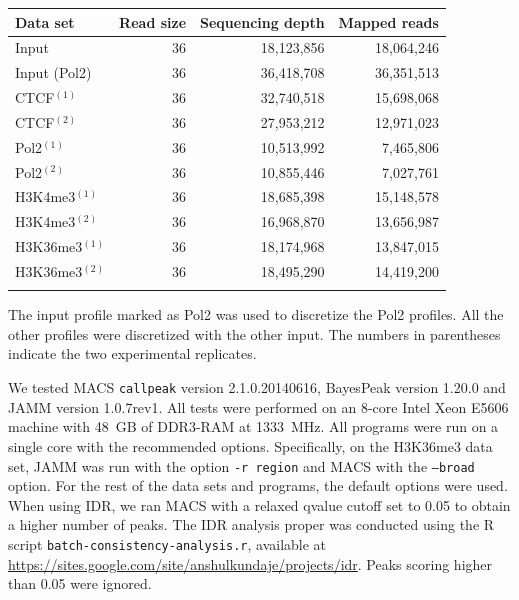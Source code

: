 \documentclass{bioinfo}
\begin{document}
\begin{methods}
\begin{table}[!tbp]
{\begin{tabular}{lrrr}
        \toprule
        \textbf{Data set} & \textbf{Read size} &
        \textbf{Sequencing depth} & \textbf{Mapped reads} \\
        \midrule
        Input            & 36 & 18,123,856 & 18,064,246 \\
        Input (Pol2)     & 36 & 36,418,708 & 36,351,513 \\
        CTCF$^{(1)}$     & 36 & 32,740,518 & 15,698,068 \\
        CTCF$^{(2)}$     & 36 & 27,953,212 & 12,971,023 \\
        Pol2$^{(1)}$     & 36 & 10,513,992 &  7,465,806 \\
        Pol2$^{(2)}$     & 36 & 10,855,446 &  7,027,761 \\
        H3K4me3$^{(1)}$  & 36 & 18,685,398 & 15,148,578 \\
        H3K4me3$^{(2)}$  & 36 & 16,968,870 & 13,656,987 \\
        H3K36me3$^{(1)}$ & 36 & 18,174,968 & 13,847,015 \\
        H3K36me3$^{(2)}$ & 36 & 18,495,290 & 14,419,200 \\
        \botrule
\end{tabular}}{The input profile marked as Pol2 was used to discretize the
Pol2 profiles. All the other profiles were discretized with the other input.
The numbers in parentheses indicate the two experimental replicates.}
\end{table}

We tested MACS \texttt{callpeak} version 2.1.0.20140616, BayesPeak
version 1.20.0 and JAMM version 1.0.7rev1. All tests were performed on
an 8-core Intel Xeon E5606 machine with 48~GB of DDR3-RAM at 1333~MHz.
All programs were run on a single core with the recommended options.
Specifically, on the H3K36me3 data set, JAMM was run with the option
\texttt{-r region} and MACS with the \texttt{--broad} option. For the rest of
the data sets and programs, the default options were used.
When using IDR, we ran MACS with a relaxed qvalue cutoff set to 0.05
to obtain a higher number of peaks. The IDR analysis proper was conducted
using the R script \texttt{batch-consistency-analysis.r}, available at
\href{https://sites.google.com/site/anshulkundaje/projects/idr}{https://sites.google.com/site/anshulkundaje/projects/idr}.
Peaks scoring higher than 0.05 were ignored.


\end{methods}
\end{document}
